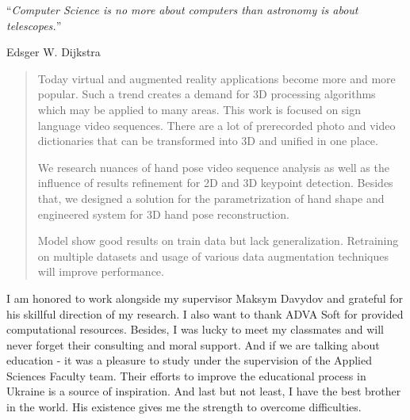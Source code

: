 \documentclass[
    11pt, 
    english, 
    singlespacing,
    headsepline,
    openany
]{MastersDoctoralThesis}
\begin{document}
\cleardoublepage


\vspace*{0.2\textheight}

\noindent\enquote{\itshape Computer Science is no more about computers than astronomy is about telescopes.}\bigbreak

\hfill Edsger W. Dijkstra


\begin{abstract}
\addchaptertocentry{\abstractname} %
Today virtual and augmented reality applications become more and more popular. Such a trend creates a demand for 3D processing algorithms which may be applied to many areas. This work is focused on sign language video sequences. There are a lot of prerecorded photo and video dictionaries that can be transformed into 3D and unified in one place. 
    
We research nuances of hand pose video sequence analysis as well as the influence of results refinement for 2D and 3D keypoint detection. Besides that, we designed a solution for the parametrization of hand shape and engineered system for 3D hand pose reconstruction.

Model show good results on train data but lack generalization.  Retraining on multiple datasets and usage of various data augmentation techniques will improve performance.
\end{abstract}


\begin{acknowledgements}
\addchaptertocentry{\acknowledgementname} %
I am honored to work alongside my supervisor Maksym Davydov and grateful for his skillful direction of my research. I also want to thank ADVA Soft for provided computational resources. Besides, I was lucky to meet my classmates and will never forget their consulting and moral support. And if we are talking about education - it was a pleasure to study under the supervision of the Applied Sciences Faculty team. Their efforts to improve the educational process in Ukraine is a source of inspiration. And last but not least, I have the best brother in the world. His existence gives me the strength to overcome difficulties.
\end{acknowledgements}
\end{document}
